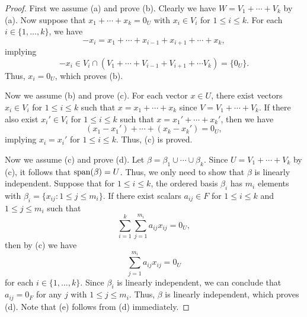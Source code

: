 \begin{proof}
  First we assume (a) and prove (b).
  Clearly we have $W = V_1 + \cdots + V_k$ by  (a).
  Now suppose that $x_1 + \cdots + x_k = 0_U$ with $x_i \in V_i$ for
  $1 \leq i \leq k$.
  For each $i \in \{1, \dots, k\}$, we have
  \begin{equation*}
    -x_i
    = x_1 + \cdots + x_{i-1} + x_{i+1} + \cdots + x_k,
  \end{equation*}
  implying
  \begin{equation*}
    -x_i
    \in V_i \cap (V_1 + \cdots + V_{i-1} + V_{i+1} + \cdots V_k)
    = \{0_U\}.
  \end{equation*}
  Thus, $x_i = 0_U$, which proves (b).

  Now we assume (b) and prove (c).
  For each vector $x \in U$, there exist vectors $x_i \in V_i$ for
  $1 \leq i \leq k$ such that $x = x_1 + \cdots + x_k$ since
  $V = V_1 + \cdots + V_k$.
  If there also exist $x_i' \in V_i$ for $1 \leq i \leq k$ such that
  $x = x_1' + \cdots + x_k'$, then we have
  \begin{equation*}
    (x_1 - x_1') + \cdots + (x_k - x_k') = 0_U,
  \end{equation*}
  implying $x_i = x_i'$ for $1 \leq i \leq k$.
  Thus, (c) is proved.

  Now we assume (c) and prove (d).
  Let $\beta = \beta_1 \cup \cdots \cup \beta_k$.
  Since $U = V_1 + \cdots + V_k$ by (c), it follows that $\operatorname{span}(\beta) = U$.
  Thus, we only need to show that $\beta$ is linearly independent.
  Suppose that for $1 \leq i \leq k$, the ordered basis $\beta_i$ has $m_i$
  elements with $\beta_i = \{x_{ij}: 1 \leq j \leq m_i\}$.
  If there exist scalars $a_{ij} \in F$ for $1 \leq i \leq k$ and
  $1 \leq j \leq m_i$ such that
  \begin{equation*}
    \sum_{i=1}^{k} \sum_{j=1}^{m_i} a_{ij}x_{ij} = 0_U,
  \end{equation*}
  then by (c) we have
  \begin{equation*}
    \sum_{j=1}^{m_i} a_{ij}x_{ij} = 0_U
  \end{equation*}
  for each $i \in \{1, \dots, k\}$.
  Since $\beta_i$ is linearly independent, we can conclude that
  $a_{ij} = 0_F$ for any $j$ with $1 \leq j \leq m_i$.
  Thus, $\beta$ is linearly independent, which proves (d).
  Note that (e) follows from (d) immediately.


\end{proof}
